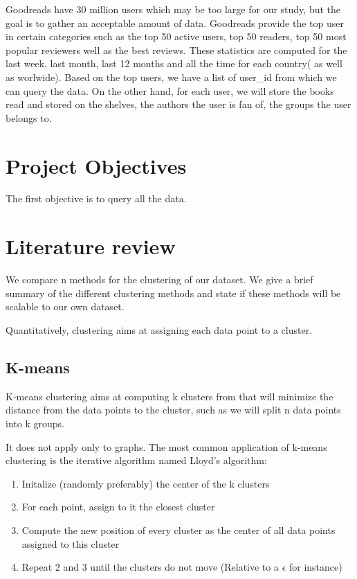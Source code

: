 \documentclass[11pt]{article}
\begin{document}
Goodreads have 30 million users which may be too large for our study, but the goal is to gather an acceptable amount of data. Goodreads provide the top user in certain categories such as the top 50 active users, top 50 readers, top 50 most popular reviewers well as the best reviews. These statistics are computed for the last week, last month, last 12 months and all the time for each country( as well as worlwide).
Based on the top users, we have a list of user\_id from which we can query the data. On the other hand, for each user, we will store the books read and stored on the shelves, the authors the user is fan of, the groups the user belongs to.

\section{Project Objectives}
The first objective is to query all the data.

\section{Literature review}

We compare n methods for the clustering of our dataset. We give a brief summary of the different clustering methods and state if these methods will be scalable to our own dataset.

Quantitatively, clustering aims at assigning each data point to a cluster.

\subsection{K-means}

K-means clustering aims at computing k clusters from that will minimize the distance from the data points to the cluster, such as we will split n data points into k groups. 


It does not apply only to graphs.
The most common application of k-means clustering is the iterative algorithm named Lloyd's algorithm:
\begin{enumerate}
\item Initalize (randomly preferably) the center of the k clusters
\item For each point, assign to it the closest cluster
\item Compute the new position of every cluster as the center of all data points assigned to this cluster
\item Repeat 2 and 3 until the clusters do not move (Relative to a $\epsilon$ for instance)
\end{enumerate}
\end{document}
